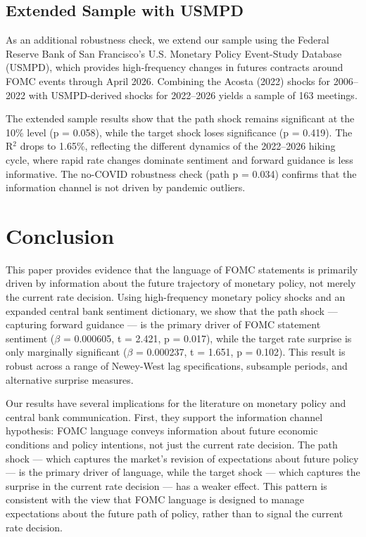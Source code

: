 \documentclass[12pt]{article}
\begin{document}
\subsection{Extended Sample with USMPD}

As an additional robustness check, we extend our sample using the Federal Reserve Bank of San Francisco's U.S. Monetary Policy Event-Study Database (USMPD), which provides high-frequency changes in futures contracts around FOMC events through April 2026. Combining the Acosta (2022) shocks for 2006--2022 with USMPD-derived shocks for 2022--2026 yields a sample of 163 meetings.

The extended sample results show that the path shock remains significant at the 10\% level (p = 0.058), while the target shock loses significance (p = 0.419). The R$^2$ drops to 1.65\%, reflecting the different dynamics of the 2022--2026 hiking cycle, where rapid rate changes dominate sentiment and forward guidance is less informative. The no-COVID robustness check (path p = 0.034) confirms that the information channel is not driven by pandemic outliers.


\section{Conclusion}

This paper provides evidence that the language of FOMC statements is primarily driven by information about the future trajectory of monetary policy, not merely the current rate decision. Using high-frequency monetary policy shocks and an expanded central bank sentiment dictionary, we show that the path shock --- capturing forward guidance --- is the primary driver of FOMC statement sentiment ($\beta$ = 0.000605, t = 2.421, p = 0.017), while the target rate surprise is only marginally significant ($\beta$ = 0.000237, t = 1.651, p = 0.102). This result is robust across a range of Newey-West lag specifications, subsample periods, and alternative surprise measures.

Our results have several implications for the literature on monetary policy and central bank communication. First, they support the information channel hypothesis: FOMC language conveys information about future economic conditions and policy intentions, not just the current rate decision. The path shock --- which captures the market's revision of expectations about future policy --- is the primary driver of language, while the target shock --- which captures the surprise in the current rate decision --- has a weaker effect. This pattern is consistent with the view that FOMC language is designed to manage expectations about the future path of policy, rather than to signal the current rate decision.
\end{document}
